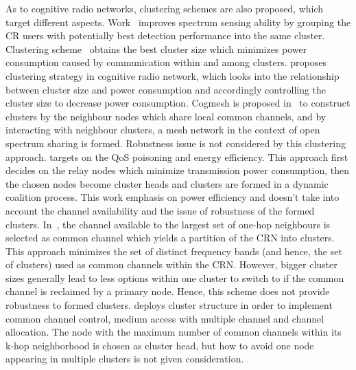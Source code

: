 \documentclass[10pt,journal,compsoc]{IEEEtran}
\theoremstyle{mytheoremstyle}
\theoremstyle{mytheoremstyle}
\theoremstyle{mytheoremstyle}
\begin{document}
As to cognitive radio networks, clustering schemes are also proposed, which target different aspects.
Work~\cite{Consensus_based_clustering12} improves spectrum sensing ability by grouping the CR users
with potentially best detection performance into the same cluster.
Clustering scheme~\cite{clustering_globecom11} obtains the best cluster size which minimizes power consumption caused by communication within and among clusters.
\cite{clustering_globecom11} proposes clustering strategy in cognitive radio network, which looks into the relationship between cluster size and power consumption and accordingly controlling the cluster size to decrease power consumption.
Cogmesh is proposed in~\cite{Chen07} to construct clusters by the neighbour nodes which share local common channels, and by interacting with neighbour clusters, a mesh network in the context of open spectrum sharing is formed.
Robustness issue is not considered by this clustering approach.
\cite{TWC2012_cooperative_communication} targets on the QoS poisoning and energy efficiency. 
This approach first decides on the relay nodes which minimize transmission power consumption, then the chosen nodes become cluster heads and clusters are formed in a dynamic coalition process.
This work emphasis on power efficiency and doesn't take into account the channel availability and the issue of robustness of the formed clusters.
In~\cite{Zhao07, Affinity_clustering_09icccn}, the channel available to the largest set of one-hop neighbours is selected as common channel which yields a partition of the CRN into clusters. 
This approach minimizes the set of distinct frequency bands (and hence, the set of clusters) used as common channels within the CRN.
However, bigger cluster sizes generally lead to less options within one cluster to switch to if the common channel is reclaimed by a primary node. 
Hence, this scheme does not provide robustness to formed clusters. 
\cite{cluster_EW10} deploys cluster structure in order to implement common channel control, medium access  with multiple channel and channel allocation. 
The node with the maximum number of common channels within its k-hop neighborhood is chosen as cluster head, but how to avoid one node appearing in multiple clusters is not given consideration.
\end{document}
